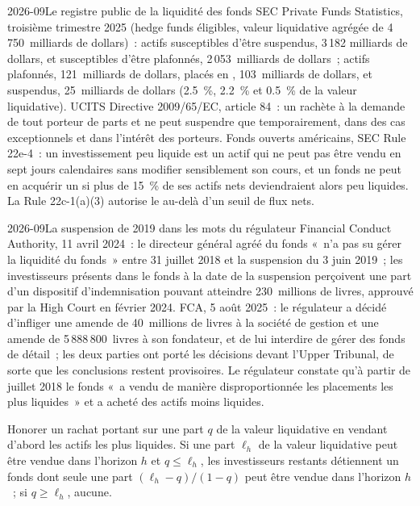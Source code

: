 \begin{dated}{2026-09}{Le registre public de la liquidité des fonds}\label{dat:fm:the-asset-manager-and-the-fund:pf}
SEC Private Funds Statistics, troisième trimestre 2025 (hedge funds éligibles, valeur liquidative agrégée de 4\,750~milliards de dollars)~: actifs susceptibles d'être suspendus, 3\,182
milliards de dollars, et susceptibles d'être plafonnés, 2\,053~milliards de dollars~; actifs plafonnés, 121~milliards de dollars, placés en , 103~milliards de dollars, et suspendus, 25~milliards de dollars (2.5~\%, 2.2~\% et
0.5~\% de la valeur liquidative). UCITS Directive 2009/65/EC, article 84~: un  rachète à la demande de tout porteur de parts et ne peut suspendre que temporairement, dans
des cas exceptionnels et dans l'intérêt des porteurs. Fonds ouverts américains, SEC Rule 22e-4~: un investissement peu liquide est un actif qui ne peut pas être vendu en
sept jours calendaires sans modifier sensiblement son cours, et un fonds ne peut en acquérir un si plus de 15~\% de ses actifs nets deviendraient alors peu liquides.
La Rule 22c-1(a)(3) autorise le  au-delà d'un seuil de flux nets.
\end{dated}

\begin{dated}{2026-09}{La suspension de 2019 dans les mots du régulateur}\label{dat:fm:the-asset-manager-and-the-fund:weif}
Financial Conduct Authority, 11 avril 2024~: le directeur général agréé du fonds «~n'a pas su gérer la liquidité du fonds~» entre
31 juillet 2018 et la suspension du 3 juin 2019~; les investisseurs présents dans le fonds à la date de la suspension perçoivent une part d'un dispositif d'indemnisation pouvant atteindre
230~millions de livres, approuvé par la High Court en février 2024. FCA, 5 août 2025~: le régulateur a décidé d'infliger une amende de 40~millions de livres à la société de gestion et une amende de
5\,888\,800~livres à son fondateur, et de lui interdire de gérer des fonds de détail~; les deux parties ont porté les décisions devant l'Upper Tribunal, de sorte que les conclusions restent provisoires. Le
régulateur constate qu'à partir de juillet 2018 le fonds «~a vendu de manière disproportionnée les placements les plus liquides~» et a acheté des actifs moins liquides.
\end{dated}

\begin{proposition}\label{prop:fm:the-asset-manager-and-the-fund:liquidfirst}
Honorer un rachat portant sur une part $q$ de la valeur liquidative en vendant d'abord les actifs les plus liquides. Si une part $\ell_h$ de la valeur liquidative peut être vendue dans l'horizon $h$ et
$q\le\ell_h$, les investisseurs restants détiennent un fonds dont seule une part $(\ell_h-q)/(1-q)$ peut être vendue dans l'horizon $h$~; si $q\ge\ell_h$, aucune.
\end{proposition}


